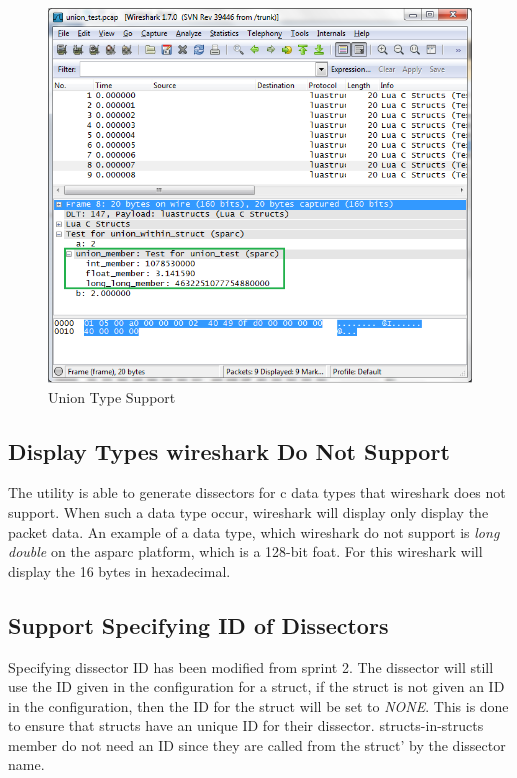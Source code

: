 \begin{figure}[ht]
	\center
	\includegraphics[width=\textwidth]{./sprints/img/wireshark_union}
	\caption{Union Type Support\label{fig:wsunion}}
\end{figure}



\subsection{Display Types \Gls{wireshark} Do Not Support}
The \gls{utility} is able to generate \glspl{dissector} for \Gls{c} data types that \Gls{wireshark} 
does not support. When such a data type occur, \Gls{wireshark} will display only 
display the \gls{packet} data. An example of a data type, which \Gls{wireshark} do not 
support is \emph{long double} on the \gls{asparc} platform, which is a 128-bit foat. 
For this \Gls{wireshark} will display the 16 bytes in \gls{hexadecimal}.

\subsection{Support Specifying ID of Dissectors}
Specifying \gls{dissector} ID has been modified from sprint 2. The \gls{dissector} will 
still use the ID given in the configuration for a \gls{struct}, if the \gls{struct} is not 
given an ID in the configuration, then the ID for the \gls{struct} will be set to 
\emph{NONE}. This is done to ensure that \glspl{struct} have an unique ID for their 
\gls{dissector}. \Glspl{struct}-in-\glspl{struct} \gls{member} do not need an ID since they are called 
from the \gls{struct}' by the \gls{dissector} name.

